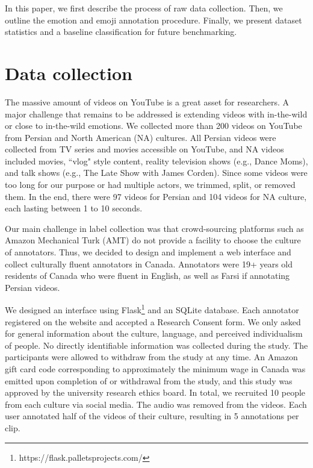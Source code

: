 \documentclass[letterpaper, 10 pt, conference]{ieeeconf}  \usepackage{FG2021}
\begin{document}
In this paper, we first describe the process of raw data collection. Then, we outline the emotion and emoji annotation procedure. Finally, we present dataset statistics and a baseline classification for future benchmarking.



\section{Data collection}

The massive amount of videos on YouTube is a great asset for researchers. A major challenge that remains to be addressed is extending videos with in-the-wild or close to in-the-wild emotions.  
We collected more than 200 videos on YouTube from Persian and North American (NA) cultures. All Persian videos were collected from TV series and movies accessible on YouTube, and NA videos included movies, ``vlog" style content, reality television shows (e.g., Dance Moms), and talk shows (e.g., The Late Show with James Corden). Since some videos were too long for our purpose or had multiple actors, we trimmed,  split, or removed them. In the end, there were 97 videos for Persian and 104 videos for NA culture, each lasting between 1 to 10 seconds.

Our main  challenge in label collection was that crowd-sourcing platforms such as Amazon Mechanical Turk (AMT) do not provide a facility to choose the culture of annotators. Thus, we decided to design and implement a web interface and collect culturally fluent annotators in Canada. Annotators were 19+ years old residents of Canada who were fluent in English, as well as Farsi if annotating Persian videos.

We designed an interface using Flask\footnote{https://flask.palletsprojects.com/} and an SQLite database. Each annotator registered on the website and accepted a Research Consent form. We only asked for general information about the culture, language, and perceived individualism of people. No directly identifiable information was collected during the study. The participants were allowed to withdraw from the study at any time. An Amazon gift card code corresponding to approximately the minimum wage in Canada was emitted upon completion of or withdrawal from the study, and this study was approved by the university research ethics board. 
In total, we recruited 10 people from each culture via social media. The audio was removed from the videos. Each user annotated half of the videos of their culture, resulting in 5 annotations per clip.
\end{document}
